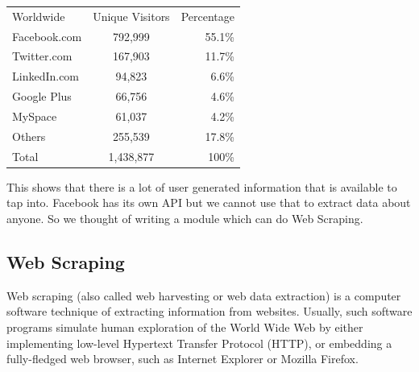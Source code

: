 \begin{table}\large
\centering
\begin{tabular}{l | c | r}
Worldwide & Unique Visitors & Percentage\\
Facebook.com & 792,999 	& 55.1\%\\
Twitter.com & 167,903 & 11.7\%\\
LinkedIn.com & 94,823 & 6.6\%\\
Google Plus & 66,756 & 4.6\%\\
MySpace & 61,037 & 4.2\%\\
Others & 255,539 & 17.8\%\\
Total & 1,438,877 & 100\%\\
\end{tabular}
\end{table}
This shows that there is a lot of user generated information that is available to tap into. Facebook has its own API but we 
cannot use that to extract data about anyone. So we thought of writing a module which can do Web Scraping.

\subsection{Web Scraping}
Web scraping (also called web harvesting or web data extraction) is a computer software technique of extracting information from 
websites. Usually, such software programs simulate human exploration of the World Wide Web by either implementing low-level Hypertext 
Transfer Protocol (HTTP), or embedding a fully-fledged web browser, such as  Internet Explorer or Mozilla Firefox.\cite{wiki_scraping}


